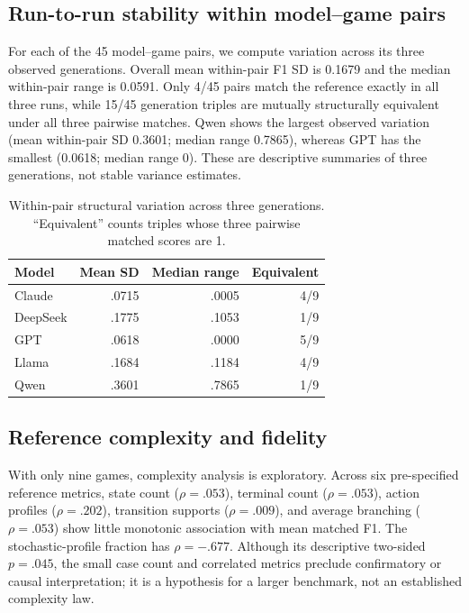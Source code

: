 \documentclass{article}
\begin{document}
\subsection{Run-to-run stability within model--game pairs}
For each of the 45 model--game pairs, we compute variation across its three observed generations. Overall mean within-pair F1 SD is 0.1679 and the median within-pair range is 0.0591. Only 4/45 pairs match the reference exactly in all three runs, while 15/45 generation triples are mutually structurally equivalent under all three pairwise matches. Qwen shows the largest observed variation (mean within-pair SD 0.3601; median range 0.7865), whereas GPT has the smallest (0.0618; median range 0). These are descriptive summaries of three generations, not stable variance estimates.

\begin{table}[t]
\centering\scriptsize
\caption{Within-pair structural variation across three generations. ``Equivalent'' counts triples whose three pairwise matched scores are 1.}
\label{tab:stability}
\begin{tabular}{lrrr}
\toprule
Model & Mean SD & Median range & Equivalent \\
\midrule
Claude & .0715 & .0005 & 4/9 \\
DeepSeek & .1775 & .1053 & 1/9 \\
GPT & .0618 & .0000 & 5/9 \\
Llama & .1684 & .1184 & 4/9 \\
Qwen & .3601 & .7865 & 1/9 \\
\bottomrule
\end{tabular}
\end{table}

\subsection{Reference complexity and fidelity}
With only nine games, complexity analysis is exploratory. Across six pre-specified reference metrics, state count ($\rho=.053$), terminal count ($\rho=.053$), action profiles ($\rho=.202$), transition supports ($\rho=.009$), and average branching ($\rho=.053$) show little monotonic association with mean matched F1. The stochastic-profile fraction has $\rho=-.677$. Although its descriptive two-sided $p=.045$, the small case count and correlated metrics preclude confirmatory or causal interpretation; it is a hypothesis for a larger benchmark, not an established complexity law.
\end{document}
